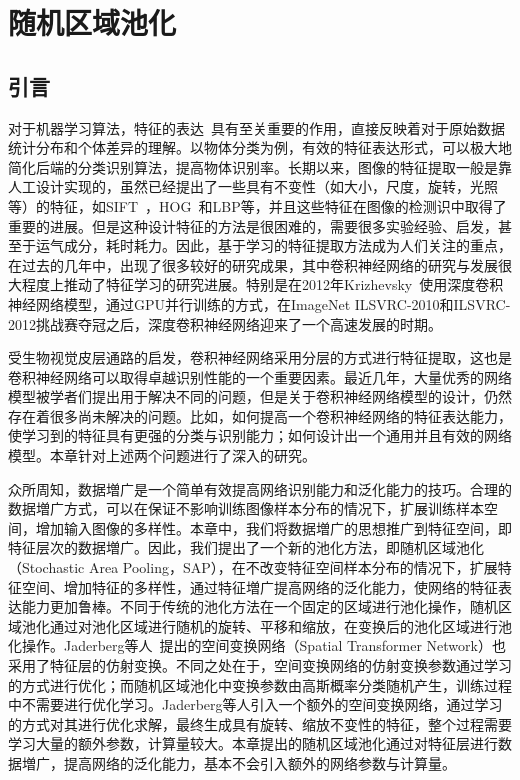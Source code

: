 \chapter{随机区域池化}
\label{cha:sap}

\section{引言}
\label{sec:sap:introduction}

对于机器学习算法，特征的表达~\cite{bengio2013representation}具有至关重要的作用，直接反映着对于原始数据统计分布和个体差异的理解。以物体分类为例，有效的特征表达形式，可以极大地简化后端的分类识别算法，提高物体识别率。长期以来，图像的特征提取一般是靠人工设计实现的，虽然已经提出了一些具有不变性（如大小，尺度，旋转，光照等）的特征，如SIFT~\cite{lowe1999object, ke2004pca,ke2004pca}，HOG~\cite{dalal2005histograms}和LBP等，并且这些特征在图像的检测识中取得了重要的进展。但是这种设计特征的方法是很困难的，需要很多实验经验、启发，甚至于运气成分，耗时耗力。因此，基于学习的特征提取方法成为人们关注的重点，在过去的几年中，出现了很多较好的研究成果，其中卷积神经网络的研究与发展很大程度上推动了特征学习的研究进展。特别是在2012年Krizhevsky~\cite{krizhevsky2012imagenet}使用深度卷积神经网络模型，通过GPU并行训练的方式，在ImageNet ILSVRC-2010和ILSVRC-2012挑战赛夺冠之后，深度卷积神经网络迎来了一个高速发展的时期。

受生物视觉皮层通路的启发，卷积神经网络采用分层的方式进行特征提取，这也是卷积神经网络可以取得卓越识别性能的一个重要因素。最近几年，大量优秀的网络模型被学者们提出用于解决不同的问题，但是关于卷积神经网络模型的设计，仍然存在着很多尚未解决的问题。比如，如何提高一个卷积神经网络的特征表达能力，使学习到的特征具有更强的分类与识别能力；如何设计出一个通用并且有效的网络模型。本章针对上述两个问题进行了深入的研究。

众所周知，数据増广是一个简单有效提高网络识别能力和泛化能力的技巧。合理的数据増广方式，可以在保证不影响训练图像样本分布的情况下，扩展训练样本空间，增加输入图像的多样性。本章中，我们将数据増广的思想推广到特征空间，即特征层次的数据増广。因此，我们提出了一个新的池化方法，即随机区域池化（Stochastic Area Pooling，SAP），在不改变特征空间样本分布的情况下，扩展特征空间、增加特征的多样性，通过特征増广提高网络的泛化能力，使网络的特征表达能力更加鲁棒。不同于传统的池化方法在一个固定的区域进行池化操作，随机区域池化通过对池化区域进行随机的旋转、平移和缩放，在变换后的池化区域进行池化操作。Jaderberg等人~\cite{jaderberg2015spatial}提出的空间变换网络（Spatial Transformer Network）也采用了特征层的仿射变换。不同之处在于，空间变换网络的仿射变换参数通过学习的方式进行优化；而随机区域池化中变换参数由高斯概率分类随机产生，训练过程中不需要进行优化学习。Jaderberg等人引入一个额外的空间变换网络，通过学习的方式对其进行优化求解，最终生成具有旋转、缩放不变性的特征，整个过程需要学习大量的额外参数，计算量较大。本章提出的随机区域池化通过对特征层进行数据増广，提高网络的泛化能力，基本不会引入额外的网络参数与计算量。

